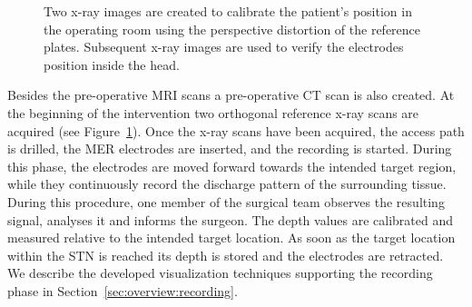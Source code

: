 \documentclass{vgtc}                          %
\begin{document}
\begin{figure}[b]
    \centering
    \hspace*{0.1cm}
    \caption{Two x-ray images are created to calibrate the patient's position in the operating room using the perspective distortion of the reference plates. Subsequent x-ray images are used to verify the electrodes position inside the head.}
    \label{fig:xrayreferencescans}
\end{figure}

Besides the pre-operative MRI scans a pre-operative CT scan is also created. At the beginning of the intervention two orthogonal reference x-ray scans are acquired (see Figure~\ref{fig:xrayreferencescans}). Once the x-ray scans have been acquired, the access path is drilled, the MER electrodes are inserted, and the recording is started. During this phase, the electrodes are moved forward towards the intended target region, while they continuously record the discharge pattern of the surrounding tissue. During this procedure, one member of the surgical team observes the resulting signal, analyses it and informs the surgeon. The depth values are calibrated and measured relative to the intended target location. As soon as the target location within the STN is reached its depth is stored and the electrodes are retracted. We describe the developed visualization techniques supporting the recording phase in Section~\ref{sec:overview:recording}.
\end{document}
